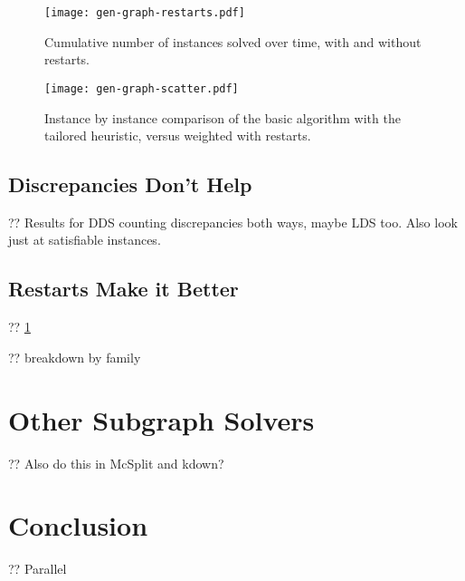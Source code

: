 \documentclass{article}
\begin{document}
\begin{figure}[p]
    \centering
    \texttt{[image: gen-graph-restarts.pdf]}

    \caption{Cumulative number of instances solved over time, with and without restarts.}
    \label{figure:restarts}
\end{figure}

\begin{figure}[p]
    \centering
    \texttt{[image: gen-graph-scatter.pdf]}

    \caption{Instance by instance comparison of the basic algorithm with the tailored heuristic,
    versus weighted with restarts.}
    \label{figure:scatter}
\end{figure}


\subsection{Discrepancies Don't Help}

?? Results for DDS counting discrepancies both ways, maybe LDS too. Also look just at satisfiable
instances.

\subsection{Restarts Make it Better}

?? \cref{figure:restarts}

?? breakdown by family

\section{Other Subgraph Solvers}

?? Also do this in McSplit and kdown?

\section{Conclusion}

?? Parallel



\end{document}

